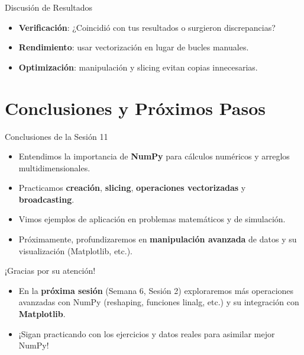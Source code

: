 \documentclass[10pt]{beamer}
\begin{document}
\begin{frame}{Discusión de Resultados}
  \begin{itemize}
    \item \textbf{Verificación}: ¿Coincidió con tus resultados o surgieron discrepancias?
    \item \textbf{Rendimiento}: usar vectorización en lugar de bucles manuales.
    \item \textbf{Optimización}: manipulación y slicing evitan copias innecesarias.
  \end{itemize}
\end{frame}

\section{Conclusiones y Próximos Pasos}

\begin{frame}{Conclusiones de la Sesión 11}
  \begin{itemize}
    \item Entendimos la importancia de \textbf{NumPy} para cálculos numéricos y arreglos multidimensionales.
    \item Practicamos \textbf{creación}, \textbf{slicing}, \textbf{operaciones vectorizadas} y \textbf{broadcasting}.
    \item Vimos ejemplos de aplicación en problemas matemáticos y de simulación.
    \item Próximamente, profundizaremos en \textbf{manipulación avanzada} de datos y su visualización (Matplotlib, etc.).
  \end{itemize}
\end{frame}

\begin{frame}
  \Huge{\centerline{¡Gracias por su atención!}}
  \vspace{0.3cm}
  \normalsize
  \begin{itemize}
    \item En la \textbf{próxima sesión} (Semana 6, Sesión 2) exploraremos más operaciones avanzadas con NumPy (reshaping, funciones linalg, etc.) y su integración con \textbf{Matplotlib}.
    \item ¡Sigan practicando con los ejercicios y datos reales para asimilar mejor NumPy!
  \end{itemize}
\end{frame}
\end{document}
